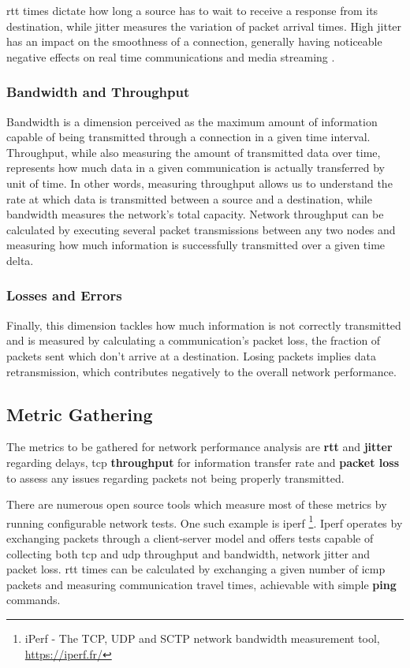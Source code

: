 \documentclass[11pt,twoside,a4paper]{report}
\begin{document}
\ac{rtt} times dictate how long a source has to wait to receive a response from its destination, while jitter measures the variation of packet arrival times. High jitter has an impact on the smoothness of a connection, generally having noticeable negative effects on real time communications and media streaming \cite{claypool1999effects}.

\subsubsection{Bandwidth and Throughput}

Bandwidth is a dimension perceived as the maximum amount of information capable of being transmitted through a connection in a given time interval. Throughput, while also measuring the amount of transmitted data over time, represents how much data in a given communication is actually transferred by unit of time. In other words, measuring throughput allows us to understand the rate at which data is transmitted between a source and a destination, while bandwidth measures the network's total capacity. Network throughput can be calculated by executing several packet transmissions between any two nodes and measuring how much information is successfully transmitted over a given time delta.

\subsubsection{Losses and Errors}

Finally, this dimension tackles how much information is not correctly transmitted and is measured by calculating a communication's packet loss, the fraction of packets sent which don't arrive at a destination. Losing packets implies data retransmission, which contributes negatively to the overall network performance.

\subsection{Metric Gathering}
\label{ss:metrics}

The metrics to be gathered for network performance analysis are \textbf{\ac{rtt}} and \textbf{jitter} regarding delays, \ac{tcp} \textbf{throughput} for information transfer rate and \textbf{packet loss} to assess any issues regarding packets not being properly transmitted.

There are numerous open source tools which measure most of these metrics by running configurable network tests. One such example is iperf \footnote{iPerf - The TCP, UDP and SCTP network bandwidth measurement tool, \url{https://iperf.fr/}}. Iperf operates by exchanging packets through a client-server model and offers tests capable of collecting both \ac{tcp} and \ac{udp} throughput and bandwidth, network jitter and packet loss. \ac{rtt} times can be calculated by exchanging a given number of \ac{icmp} packets and measuring communication travel times, achievable with simple \textbf{ping} commands.
\end{document}
